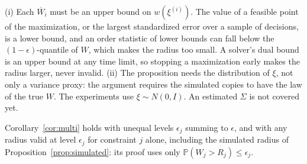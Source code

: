 \begin{remark}\label{rem:simulated}
(i) Each $\overline W_i$ must be an upper bound on $w(\xi^{(i)})$. The value
of a feasible point of the maximization, or the largest standardized error
over a sample of decisions, is a lower bound, and an order statistic of lower
bounds can fall below the $(1-\epsilon)$-quantile of $W$, which makes the
radius too small. A solver's dual bound is an upper bound at any time limit,
so stopping a maximization early makes the radius larger, never invalid.
(ii) The proposition needs the distribution of $\xi$, not only a variance
proxy: the argument requires the simulated copies to have the law of the
true $W$. The experiments use $\xi \sim N(0, I)$. An estimated $\Sigma$ is
not covered yet. 
\end{remark}

Corollary~\ref{cor:multi} holds with unequal levels $\epsilon_j$ summing to
$\epsilon$, and with any radius valid at level $\epsilon_j$ for constraint $j$
alone, including the simulated radius of
Proposition~\ref{prop:simulated}: its proof uses only
$\mathbb{P}(W_j > R_j) \le \epsilon_j$. 
